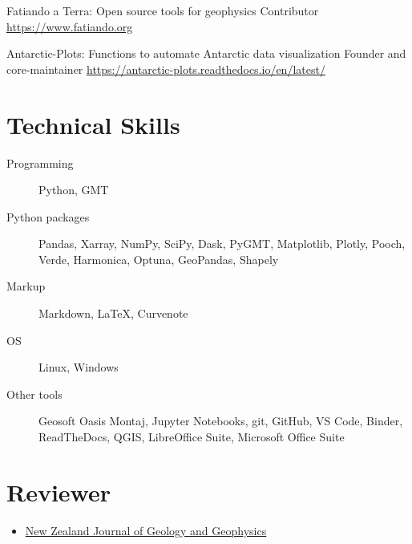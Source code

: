 \documentclass{ExpressiveResume}
\begin{document}
\begin{cventries}
    {Fatiando a Terra: Open source tools for geophysics}
    {Contributor \newline \url{https://www.fatiando.org}}

    {Antarctic-Plots: Functions to automate Antarctic data visualization}
    {Founder and core-maintainer \newline \url{https://antarctic-plots.readthedocs.io/en/latest/}}
\end{cventries}


\section{Technical Skills}

\begin{description}
    \item[Programming] Python, GMT
    \item[Python packages] Pandas, Xarray, NumPy, SciPy, Dask, PyGMT,
        Matplotlib, Plotly, Pooch, Verde, Harmonica, Optuna, GeoPandas, Shapely
    \item[Markup] Markdown, \LaTeX, Curvenote
    \item[OS] Linux, Windows
    \item[Other tools] Geosoft Oasis Montaj, Jupyter Notebooks, git,
        GitHub, VS Code, Binder,
        ReadTheDocs, QGIS, LibreOffice Suite, Microsoft Office Suite
\end{description}



\section{Reviewer}

\begin{itemize}[label={}, leftmargin=*]
    \item \href{https://www.tandfonline.com/toc/tnzg20/current}{New
              Zealand Journal of Geology and Geophysics}
\end{itemize}
\end{document}

